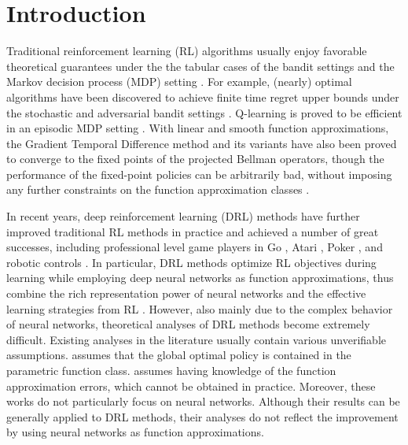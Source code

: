 \section{Introduction}
\label{sec:introduction}

Traditional reinforcement learning (RL) algorithms usually enjoy favorable theoretical guarantees under the the tabular cases of the bandit settings and the Markov decision process (MDP) setting \citep{sutton2018reinforcement}.
For example, (nearly) optimal algorithms have been discovered to achieve finite time regret upper bounds under the stochastic and adversarial bandit settings \citep{bubeck2012regret}. Q-learning is proved to be efficient in an episodic MDP setting \cite{jin2018q}. With linear and smooth function approximations, the Gradient Temporal Difference method and its variants have also been proved to converge to the fixed points of the projected Bellman operators, though the performance of the fixed-point policies can be arbitrarily bad, without imposing any further constraints on the function approximation classes \citep{sutton2009fast,sutton2009convergent,bhatnagar2009convergent}.

In recent years, deep reinforcement learning (DRL) methods have further improved traditional RL methods in practice and achieved a number of great successes, including professional level game players in Go \citep{silver2016masteringA,silver2017masteringB}, Atari \citep{mnih2015human}, Poker \citep{moravvcik2017deepstack}, and robotic controls \citep{lillicrap2015continuous,levine2016end}.
In particular, DRL methods optimize RL objectives during learning while employing deep neural networks as function approximations, thus combine the rich representation power of neural networks and the effective learning strategies from RL \citep{sutton2018reinforcement}. 
However, also mainly due to the complex behavior of neural networks, theoretical analyses of DRL methods become extremely difficult.
Existing analyses in the literature usually contain various unverifiable assumptions. \citep{krishnamurthy2016pac} assumes that the global optimal policy is contained in the parametric function class. \citep{dai2018sbeed} assumes having knowledge of the function approximation errors, which cannot be obtained in practice.
Moreover, these works do not particularly focus on neural networks. Although their results can be generally applied to DRL methods, their analyses do not reflect the improvement by using neural networks as function approximations. 

